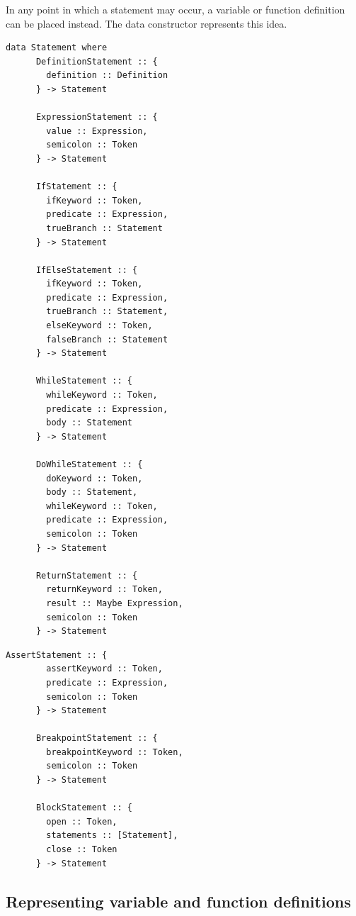 \documentclass[UdineBachThesis,american,11pt]{PhdThesis}
\begin{document}
  In any point in which a statement may occur, a variable or function definition
  can be placed instead. The data constructor \lstinline@DefinitionStatement@
  represents this idea.

  \begin{lstlisting}[gobble=4,basicstyle=\ttfamily\small]
    data Statement where
      DefinitionStatement :: {
        definition :: Definition
      } -> Statement

      ExpressionStatement :: {
        value :: Expression,
        semicolon :: Token
      } -> Statement

      IfStatement :: {
        ifKeyword :: Token,
        predicate :: Expression,
        trueBranch :: Statement
      } -> Statement

      IfElseStatement :: {
        ifKeyword :: Token,
        predicate :: Expression,
        trueBranch :: Statement,
        elseKeyword :: Token,
        falseBranch :: Statement
      } -> Statement

      WhileStatement :: {
        whileKeyword :: Token,
        predicate :: Expression,
        body :: Statement
      } -> Statement

      DoWhileStatement :: {
        doKeyword :: Token,
        body :: Statement,
        whileKeyword :: Token,
        predicate :: Expression,
        semicolon :: Token
      } -> Statement

      ReturnStatement :: {
        returnKeyword :: Token,
        result :: Maybe Expression,
        semicolon :: Token
      } -> Statement
  \end{lstlisting}

  \pagebreak

  \begin{lstlisting}[gobble=4,basicstyle=\ttfamily\small]
      AssertStatement :: {
        assertKeyword :: Token,
        predicate :: Expression,
        semicolon :: Token
      } -> Statement

      BreakpointStatement :: {
        breakpointKeyword :: Token,
        semicolon :: Token
      } -> Statement

      BlockStatement :: {
        open :: Token,
        statements :: [Statement],
        close :: Token
      } -> Statement
  \end{lstlisting}

  \subsection{Representing variable and function definitions}
\end{document}
